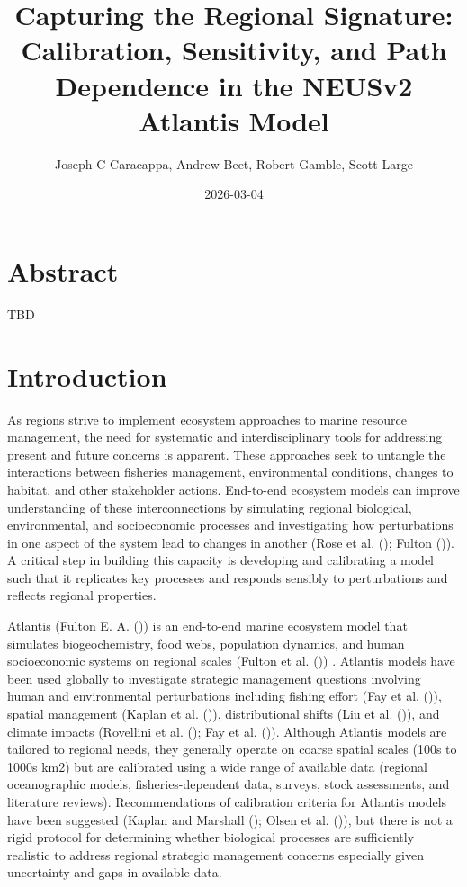 \documentclass[
]{article}
\title{Capturing the Regional Signature: Calibration, Sensitivity, and Path Dependence in the NEUSv2 Atlantis Model}
\author{Joseph C Caracappa, Andrew Beet, Robert Gamble, Scott Large}
\date{2026-03-04}
\begin{document}
\maketitle

\section{Abstract}\label{abstract}

TBD

\section{Introduction}\label{introduction}

As regions strive to implement ecosystem approaches to marine resource management, the need for systematic and interdisciplinary tools for addressing present and future concerns is apparent. These approaches seek to untangle the interactions between fisheries management, environmental conditions, changes to habitat, and other stakeholder actions. End-to-end ecosystem models can improve understanding of these interconnections by simulating regional biological, environmental, and socioeconomic processes and investigating how perturbations in one aspect of the system lead to changes in another (Rose et al. (); Fulton ()). A critical step in building this capacity is developing and calibrating a model such that it replicates key processes and responds sensibly to perturbations and reflects regional properties.

Atlantis (Fulton E. A. ()) is an end-to-end marine ecosystem model that simulates biogeochemistry, food webs, population dynamics, and human socioeconomic systems on regional scales (Fulton et al. ()) . Atlantis models have been used globally to investigate strategic management questions involving human and environmental perturbations including fishing effort (Fay et al. ()), spatial management (Kaplan et al. ()), distributional shifts (Liu et al. ()), and climate impacts (Rovellini et al. (); Fay et al. ()). Although Atlantis models are tailored to regional needs, they generally operate on coarse spatial scales (100s to 1000s km2) but are calibrated using a wide range of available data (regional oceanographic models, fisheries-dependent data, surveys, stock assessments, and literature reviews). Recommendations of calibration criteria for Atlantis models have been suggested (Kaplan and Marshall (); Olsen et al. ()), but there is not a rigid protocol for determining whether biological processes are sufficiently realistic to address regional strategic management concerns especially given uncertainty and gaps in available data.
\end{document}
